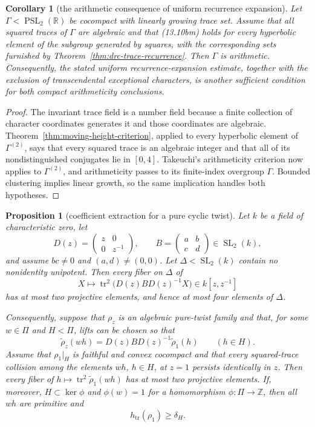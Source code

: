 \documentclass[11pt,reqno]{amsart}
\newtheorem{proposition}[theorem]{Proposition}
\newtheorem{corollary}[theorem]{Corollary}
\theoremstyle{definition}
\theoremstyle{remark}
\newcommand{\R}{\mathbb R}
\newcommand{\Z}{\mathbb Z}
\newcommand{\Tr}{\operatorname{tr}}
\newcommand{\SL}{\operatorname{SL}}
\newcommand{\PSL}{\operatorname{PSL}}
\begin{document}
\begin{corollary}[the arithmetic consequence of uniform recurrence expansion]
\label{cor:moving-height-arithmeticity}
Let \(\Gamma<\PSL_2(\R)\) be cocompact with linearly growing trace set.
Assume that all squared traces of \(\Gamma\) are algebraic and that
(13.10bm) holds for every hyperbolic element of the subgroup generated by
squares, with the corresponding sets furnished by
Theorem~\ref{thm:drc-trace-recurrence}.  Then \(\Gamma\) is arithmetic.
Consequently, the stated uniform recurrence-expansion estimate, together
with the exclusion of transcendental exceptional characters, is another
sufficient condition for both compact arithmeticity conclusions.
\end{corollary}

\begin{proof}
The invariant trace field is a number field because a finite collection of
character coordinates generates it and those coordinates are algebraic.
Theorem~\ref{thm:moving-height-criterion}, applied to every hyperbolic
element of \(\Gamma^{(2)}\), says that every squared trace is an algebraic
integer and that all of its nondistinguished conjugates lie in \([0,4]\).
Takeuchi's arithmeticity criterion \cite{Takeuchi} now applies to \(\Gamma^{(2)}\), and
arithmeticity passes to its finite-index overgroup \(\Gamma\).  Bounded
clustering implies linear growth, so the same implication handles both
hypotheses.
\end{proof}

\begin{proposition}[coefficient extraction for a pure cyclic twist]
\label{prop:pure-twist-coefficients}
Let \(k\) be a field of characteristic zero, let
\[
 D(z)=\begin{pmatrix}z&0\\0&z^{-1}\end{pmatrix},\qquad
 B=\begin{pmatrix}a&b\\c&d\end{pmatrix}\in\SL_2(k),
\]
and assume \(bc\ne0\) and \((a,d)\ne(0,0)\).  Let
\(\Delta<\SL_2(k)\) contain no nonidentity unipotent.  Then every fiber on
\(\Delta\) of
\[
 X\longmapsto
 \Tr^2\!\bigl(D(z)BD(z)^{-1}X\bigr)\in k[z,z^{-1}]
\]
has at most two projective elements, and hence at most four elements of
\(\Delta\).

Consequently, suppose that \(\rho_z\) is an algebraic pure-twist family and
that, for some \(w\in\Pi\) and \(H<\Pi\), lifts can be chosen so that
\[
 \widetilde\rho_z(wh)=
 D(z)BD(z)^{-1}\widetilde\rho_1(h)\qquad(h\in H).
\]
Assume that \(\rho_1|_H\) is faithful and convex cocompact and that every
squared-trace collision among the elements \(wh\), \(h\in H\), at \(z=1\)
persists identically in \(z\).  Then every fiber of
\(h\mapsto\Tr^2\widetilde\rho_1(wh)\) has at most two projective elements.
If, moreover, \(H\subset\ker\phi\) and \(\phi(w)=1\) for a homomorphism
\(\phi\colon\Pi\to\Z\), then all \(wh\) are primitive and
\[
 h_{\Tr}(\rho_1)\ge\delta_H.
\]
\end{proposition}
\end{document}

